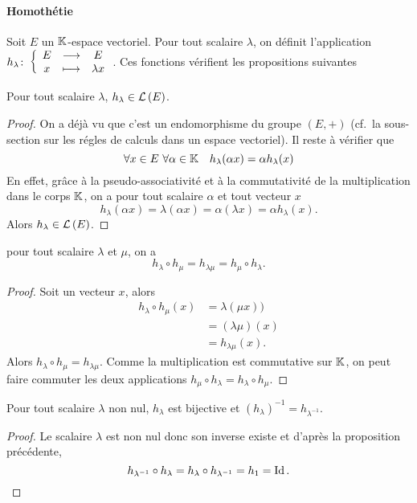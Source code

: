 \paragraph{Homothétie}
Soit \(E\) un \(\mathbb{K}\)-espace vectoriel. Pour tout scalaire \(\lambda\), on définit l'application \(h_\lambda\colon \left\{\begin{array}{ccc} E & \longrightarrow &E\\ x & \longmapsto & \lambda x \end{array} \right.\). Ces fonctions vérifient les propositions suivantes
\begin{prop}
  Pour tout scalaire \(\lambda\), \(h_\lambda \in \mathcal{L}\left(E\right)\).
\end{prop}
\begin{proof}
  On a déjà vu que c'est un endomorphisme du groupe \((E,+)\) (cf.\ la sous-section sur les régles de calculs dans un espace vectoriel). Il reste à vérifier que
  \begin{equation}
    \forall x \in E \ \forall \alpha \in \mathbb{K} \quad h_\lambda(\alpha x)=\alpha h_\lambda(x)
  \end{equation}
  En effet, grâce à la pseudo-associativité et à la commutativité de la multiplication dans le corps \(\mathbb{K}\), on a pour tout scalaire \(\alpha\) et tout vecteur \(x\)
  \begin{equation}
    h_\lambda(\alpha x) = \lambda (\alpha x)= \alpha (\lambda x)=\alpha h_\lambda(x).
  \end{equation}
  Alors \(h_\lambda \in \mathcal{L}\left(E\right)\).
\end{proof}
\begin{prop}
  pour tout scalaire \(\lambda\) et \(\mu\), on a
  \begin{equation}
    h_\lambda \circ h_\mu = h_{\lambda\mu}=h_\mu \circ h_\lambda.
  \end{equation}
\end{prop}
\begin{proof}
  Soit un vecteur \(x\), alors
  \begin{align}
    h_\lambda \circ h_\mu(x)&= \lambda(\mu x)) \\
                            &=(\lambda\mu)(x)\\
                            &= h_{\lambda\mu}(x).
  \end{align}
  Alors \(h_\lambda \circ h_\mu = h_{\lambda\mu}\). Comme la multiplication est commutative sur \(\mathbb{K}\), on peut faire commuter les deux applications \(h_\mu \circ h_\lambda=h_\lambda \circ h_\mu \).
\end{proof}
\begin{prop}
  Pour tout scalaire \(\lambda\) non nul, \(h_\lambda\) est bijective et \((h_\lambda)^{-1}=h_{\lambda^{-1}}\).
\end{prop}
\begin{proof}
  Le scalaire \(\lambda\) est non nul donc son inverse existe et d'après la proposition précédente,
  \begin{equation}
    h_{\lambda^{-1}} \circ h_\lambda = h_\lambda \circ h_{\lambda^{-1}} = h_1=\operatorname{Id}.
  \end{equation}
\end{proof}

